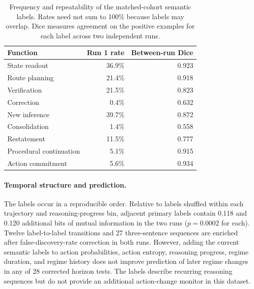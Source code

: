 \documentclass{article}
\begin{document}
\begin{table}[htbp]
\centering
\small
\begin{tabular}{lrr}
\toprule
Function & Run 1 rate & Between-run Dice \\
\midrule
State readout & 36.9\% & 0.923 \\
Route planning & 21.4\% & 0.918 \\
Verification & 21.5\% & 0.823 \\
Correction & 0.4\% & 0.632 \\
New inference & 39.7\% & 0.872 \\
Consolidation & 1.4\% & 0.558 \\
Restatement & 11.5\% & 0.777 \\
Procedural continuation & 5.1\% & 0.915 \\
Action commitment & 5.6\% & 0.934 \\
\bottomrule
\end{tabular}
\caption{Frequency and repeatability of the matched-cohort semantic labels.
Rates need not sum to 100\% because labels may overlap. Dice measures agreement
on the positive examples for each label across two independent runs.}
\label{tab:semantic-label-repeatability}
\end{table}

\paragraph{Temporal structure and prediction.}
The labels occur in a reproducible order. Relative to labels shuffled within
each trajectory and reasoning-progress bin, adjacent primary labels contain
0.118 and 0.120 additional bits of mutual information in the two runs
($p=0.0002$ for each). Twelve
label-to-label transitions and 27 three-sentence sequences are enriched after
false-discovery-rate correction in both runs. However, adding the current
semantic labels to action probabilities, action entropy, reasoning progress,
regime duration, and regime history does not improve prediction of later
regime changes in any of 28 corrected horizon tests. The labels describe
recurring reasoning sequences but do not provide an additional action-change
monitor in this dataset.
\end{document}
